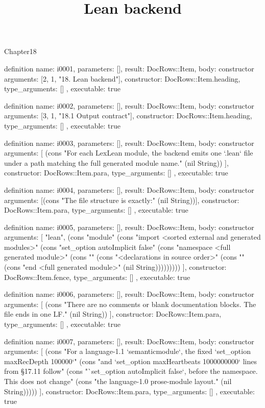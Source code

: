 \begin{lexlean}{Chapter18}
\title{Lean backend}
\begin{semanticmodule}
definition{
  name: i0001,
  parameters: [],
  result: DocRows::Item,
  body: constructor{
    arguments: [2, 1, "18. Lean backend"],
    constructor: DocRows::Item.heading,
    type_arguments: []
  },
  executable: true
}

definition{
  name: i0002,
  parameters: [],
  result: DocRows::Item,
  body: constructor{
    arguments: [3, 1, "18.1 Output contract"],
    constructor: DocRows::Item.heading,
    type_arguments: []
  },
  executable: true
}

definition{
  name: i0003,
  parameters: [],
  result: DocRows::Item,
  body: constructor{
    arguments: [
      (cons "For each LexLean module, the backend emits one `.lean` file under a path matching the full generated module name." (nil String))
    ],
    constructor: DocRows::Item.para,
    type_arguments: []
  },
  executable: true
}

definition{
  name: i0004,
  parameters: [],
  result: DocRows::Item,
  body: constructor{
    arguments: [(cons "The file structure is exactly:" (nil String))],
    constructor: DocRows::Item.para,
    type_arguments: []
  },
  executable: true
}

definition{
  name: i0005,
  parameters: [],
  result: DocRows::Item,
  body: constructor{
    arguments: [
      "lean",
      (cons "module" (cons "import <sorted external and generated modules>" (cons "set_option autoImplicit false" (cons "namespace <full generated module>" (cons "" (cons "<declarations in source order>" (cons "" (cons "end <full generated module>" (nil String)))))))))
    ],
    constructor: DocRows::Item.fence,
    type_arguments: []
  },
  executable: true
}

definition{
  name: i0006,
  parameters: [],
  result: DocRows::Item,
  body: constructor{
    arguments: [
      (cons "There are no comments or blank documentation blocks. The file ends in one LF." (nil String))
    ],
    constructor: DocRows::Item.para,
    type_arguments: []
  },
  executable: true
}

definition{
  name: i0007,
  parameters: [],
  result: DocRows::Item,
  body: constructor{
    arguments: [
      (cons "For a language-1.1 `semanticmodule`, the fixed `set_option maxRecDepth 100000`" (cons "and `set_option maxHeartbeats 1000000000` lines from §17.11 follow" (cons "`set_option autoImplicit false`, before the namespace. This does not change" (cons "the language-1.0 prose-module layout." (nil String)))))
    ],
    constructor: DocRows::Item.para,
    type_arguments: []
  },
  executable: true
}


\end{semanticmodule}
\end{lexlean}
